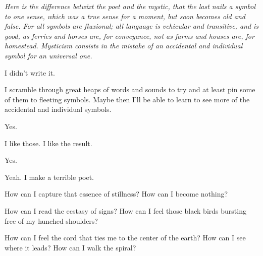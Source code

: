 \noindent \emph{Here is the difference betwixt the poet and the mystic, that the last nails a symbol to one sense, which was a true sense for a moment, but soon becomes old and false. For all symbols are fluxional; all language is vehicular and transitive, and is good, as ferries and horses are, for conveyance, not as farms and houses are, for homestead. Mysticism consists in the mistake of an accidental and individual symbol for an universal one.}


\noindent I didn't write it.


\noindent I scramble through great heaps of words and sounds to try and at least pin some of them to fleeting symbols. Maybe then I'll be able to learn to see more of the accidental and individual symbols.


\noindent Yes.


\noindent I like those. I like the result.


\noindent Yes.


\noindent Yeah. I make a terrible poet.

\newpage

\noindent How can I capture that essence of stillness? How can I become nothing?


\noindent How can I read the ecstasy of signs? How can I feel those black birds bursting free of my hunched shoulders?


\noindent How can I feel the cord that ties me to the center of the earth? How can I see where it leads? How can I walk the spiral?


